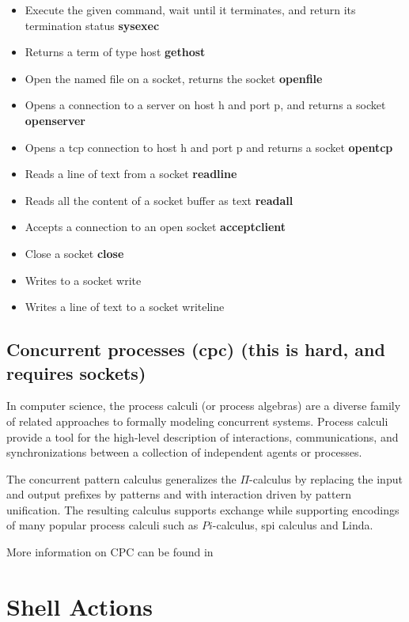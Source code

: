 \documentclass[12pt]{article}
\begin{document}
\begin{itemize}
 \item  Execute the given command, wait until it terminates, and return its termination status \textbf{sysexec}
 \item  Returns a term of type host \textbf{gethost}
 \item  Open the named file on a socket, returns the socket   \textbf{openfile}
 \item  Opens a connection to a server on host h and port p, and returns a socket  \textbf{openserver}
 \item  Opens a tcp connection to host h and port p and returns a socket \textbf{opentcp}
 \item  Reads a line of text from a socket \textbf{readline}
 \item  Reads all the content of a socket buffer as text \textbf{readall}
 \item  Accepts a connection to an open socket \textbf{acceptclient}
 \item  Close a socket \textbf{close}
 \item  Writes to a socket {write}
 \item  Writes a line of text to a socket {writeline}
\end{itemize}                                                                                  


\subsection{Concurrent processes (cpc) (this is hard, and requires sockets)  }

In computer science, the process calculi (or process algebras) are a diverse family of related approaches to formally modeling concurrent systems. 
Process calculi provide a tool for the high-level description of interactions, communications, and synchronizations between a collection of independent agents or processes.

The concurrent pattern calculus generalizes the $\Pi$-calculus by replacing the input and output prefixes
by patterns and with interaction driven by pattern unification. The resulting calculus supports exchange
while supporting encodings of many popular process calculi such as $Pi$-calculus, spi calculus and
Linda.

More information on CPC can be found in \cite{}


\section{Shell Actions}
\end{document}
